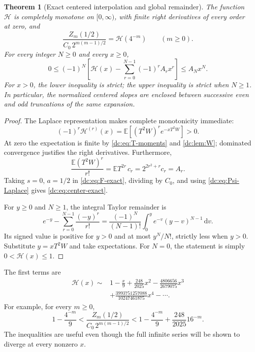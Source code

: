 \documentclass[11pt,a4paper,oneside,openany]{book}
\numberwithin{equation}{chapter}
\newtheorem{theorem}{Theorem}[chapter]
\theoremstyle{definition}
\theoremstyle{remark}
\newcommand{\E}{\mathbb E}
\newcommand{\dd}{\,\mathrm d}
\newcommand{\calH}{\mathcal H}
\begin{document}
\begin{theorem}[Exact centered interpolation and global remainder]
\label{dc:thm:alternating}
The function $\calH$ is completely monotone on $[0,\infty)$, with
finite right derivatives of every order at zero, and
\begin{equation}
 \boxed{\displaystyle
 \frac{Z_m(1/2)}{C_0\,2^{m(m-1)/2}}=\calH(4^{-m})
 \qquad(m\ge0).}
 \label{dc:eq:center-exact}
\end{equation}
For every integer $N\ge0$ and every $x\ge0$,
\begin{equation}
 \boxed{\displaystyle
 0\le(-1)^N\left[\calH(x)-\sum_{r=0}^{N-1}(-1)^rA_rx^r\right]
       \le A_Nx^N.}
 \label{dc:eq:alternating-bound}
\end{equation}
For $x>0$, the lower inequality is strict; the upper inequality is
strict when $N\ge1$. In particular, the normalized centered slopes
are enclosed between successive even and odd truncations of the
same expansion.
\end{theorem}
\begin{proof}
The Laplace representation makes complete monotonicity immediate:
\[
 (-1)^r\calH^{(r)}(x)=\E[(T^2W)^r e^{-xT^2W}]>0.
\]
At zero the expectation is finite by \cref{dc:eq:T-moments} and
\cref{dc:lem:W}; dominated convergence justifies the right derivatives.
Furthermore,
\[
 \frac{\E(T^2W)^r}{r!}
 =\E T^{2r}\,c_r=2^{2r^2+r}c_r=A_r.
\]
Taking $s=0$, $a=1/2$ in \cref{dc:eq:F-exact}, dividing by $C_0$,
and using \cref{dc:eq:Psi-Laplace} gives \cref{dc:eq:center-exact}.

For $y\ge0$ and $N\ge1$, the integral Taylor remainder is
\[
 e^{-y}-\sum_{r=0}^{N-1}\frac{(-y)^r}{r!}
 =\frac{(-1)^N}{(N-1)!}\int_0^y e^{-v}(y-v)^{N-1}\dd v.
\]
Its signed value is positive for $y>0$ and at most $y^N/N!$,
strictly less when $y>0$. Substitute $y=xT^2W$ and take expectations.
For $N=0$, the statement is simply $0<\calH(x)\le1$.
\end{proof}

The first terms are
\begin{align}
 \calH(x)\sim{}&1-\frac{x}{9}
       +\frac{248}{2025}x^2
       -\frac{4806656}{2679075}x^3\nonumber\\
 &+\frac{3993751257088}{10247461875}x^4-\cdots.
 \label{dc:eq:calH-first}
\end{align}
For example, for every $m\ge0$,
\begin{equation}
 1-\frac{4^{-m}}9
 <\frac{Z_m(1/2)}{C_0\,2^{m(m-1)/2}}
 <1-\frac{4^{-m}}9+\frac{248}{2025}16^{-m}.
 \label{dc:eq:center-low-bounds}
\end{equation}
The inequalities are useful even though the full infinite series
will be shown to diverge at every nonzero $x$.
\end{document}
